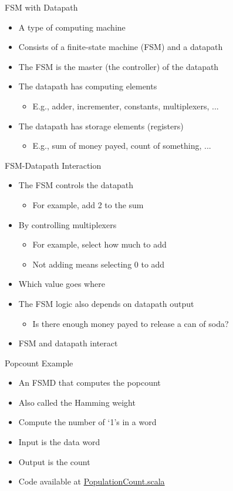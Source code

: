 \begin{frame}[fragile]{FSM with Datapath}
\begin{itemize}
\item A type of computing machine
\item Consists of a finite-state machine (FSM) and a datapath
\item The FSM is the master (the controller) of the datapath
\item The datapath has computing elements
\begin{itemize}
\item E.g., adder, incrementer, constants, multiplexers, ...
\end{itemize}
\item The datapath has storage elements (registers)
\begin{itemize}
\item E.g., sum of money payed, count of something, ...
\end{itemize}
\end{itemize}
\end{frame}

\begin{frame}[fragile]{FSM-Datapath Interaction}
\begin{itemize}
\item The FSM controls the datapath
\begin{itemize}
\item For example, add 2 to the sum
\end{itemize}
\item By controlling multiplexers
\begin{itemize}
\item For example, select how much to add
\item Not adding means selecting 0 to add
\end{itemize}
\item Which value goes where
\item The FSM logic also depends on datapath output
\begin{itemize}
\item Is there enough money payed to release a can of soda?
\end{itemize}
\item FSM and datapath interact
\end{itemize}
\end{frame}


\begin{frame}[fragile]{Popcount Example}
\begin{itemize}
\item An FSMD that computes the popcount
\item Also called the Hamming weight
\item Compute the number of `1's in a word
\item Input is the data word
\item Output is the count
\item Code available at \href{https://github.com/schoeberl/chisel-book/blob/master/src/main/scala/PopulationCount.scala}{PopulationCount.scala}
\end{itemize}
\end{frame}

